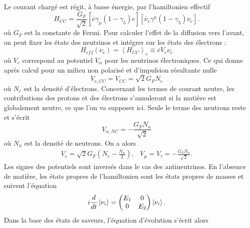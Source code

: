             Le courant chargé est régit, à basse énergie, par l'hamiltonien effectif\cite{Akhmedov2000}
            \begin{equation}
                H_{CC} = \frac{G_F}{\sqrt{2}}\left[\overline{e}\gamma_{\mu}(1-\gamma_5)e\right]\left[\overline{\nu}_e\gamma^{\mu}(1-\gamma_5)\nu_e\right].
            \end{equation}
            où $G_F$ est la constante de Fermi. Pour calculer l'effet de la diffusion vers l'avant, on peut fixer les états des neutrinos et intégrer sur les états des électrons : 
            \begin{equation}
                H_{eff}(\nu_e) = \left<H_{CC}\right>_{e} \equiv \overline{e}V_e\nu_e
            \end{equation}
            où $V_e$ correspond au potentiel $V_{\alpha}$ pour les neutrinos électroniques. Ce qui donne après calcul pour un milieu non polarisé et d'impulsion résultante nulle\cite{Akhmedov2000}
            \begin{equation}
                V_{e,CC} = V_{CC} = \sqrt{2}G_F N_e
            \end{equation}
            où $N_e$ est la densité d'électrons. Concernant les termes de courant neutre, les contributions des protons et des électrons s'annuleront si la matière est globalement neutre, ce que l'on va supposer ici. Seule le terme des neutrons reste et s'écrit 
            \begin{equation}
                V_{\alpha,NC} = -\frac{G_F N_n}{\sqrt{2}}
            \end{equation}
            où $N_n$ est la densité de neutrons. On a alors 
            \begin{eqnarray}
                V_e = \sqrt{2}G_F\left(N_e-\frac{N_n}{2}\right), & V_{\mu} = V_{\tau} = -\frac{G_F N_n}{\sqrt{2}}.
            \end{eqnarray}
            Les signes des potentiels sont inversés dans le cas des antineutrinos.
            En l'absence de matière, les états propres de l'hamiltonien sont les états propres de masses et suivent l'équation
            \begin{equation}
                i\frac{d}{dt}\ket{\nu_i} = \left(\begin{matrix}E_1 & 0 \\ 0 & E_2\end{matrix}\right)\ket{\nu_i}.
            \end{equation}
            Dans la base des états de saveurs, l'équation d'évolution s'écrit alors
